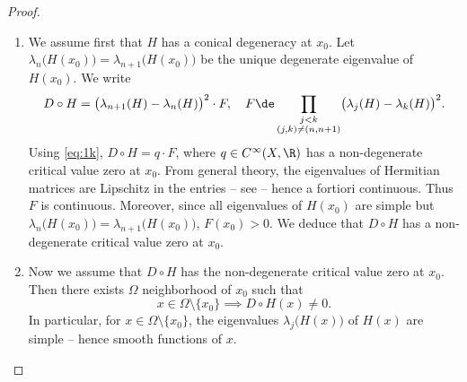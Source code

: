 \pagebreak[2]
\skpt
\begin{proof}
\begin{enumerate}
\item
We assume first that $H$ has a conical degeneracy at $x_0$. Let $\lambda_n\bigl( H(x_0) \bigr) = \lambda_{n+1}\bigl( H(x_0) \bigr)$ be the unique degenerate eigenvalue of $H(x_0)$. We write\vspace*{-3pt}
\begin{equation*}
D \circ H = \bigl( \lambda_{n+1}(H) - \lambda_n(H)\bigr)^2 \cdot F, \quad F \de \prod_{\substack{j < k \\ (j,k) \neq (n,n+1)}} \bigl(\lambda_j(H)-\lambda_k(H)\bigr)^2.
\end{equation*}
Using \eqref{eq:1k}, $D \circ H = q \cdot F$, where $q \in C^\infty(X,\R)$ has a non-degenerate critical value zero at $x_0$. From general theory, the eigenvalues of Hermitian matrices are Lipschitz in the entries -- see \cite[Prop.\,6.2]{S10} -- hence a fortiori continuous. Thus $F$ is continuous. Moreover, since all eigenvalues of $H(x_0)$ are simple but $\lambda_n\bigl( H(x_0) \bigr) = \lambda_{n+1}\bigl( H(x_0) \bigr)$, $F(x_0) > 0$. We deduce that $D \circ H$ has a non-degenerate critical value zero at $x_0$.

\item
Now we assume that $D \circ H$ has the non-degenerate critical value zero at $x_0$. Then there exists $\Omega$ neighborhood of $x_0$ such that\vspace*{-3pt}
\begin{equation*}
x \in \Omega \setminus \{ x_0\} \implies D \circ H(x) \neq 0.
\end{equation*}
In particular, for $x \in \Omega \setminus \{ x_0\}$, the eigenvalues $\lambda_j\bigl(H(x)\bigr)$ of $H(x)$ are simple -- hence smooth functions of $x$.


\end{enumerate}
\end{proof}
